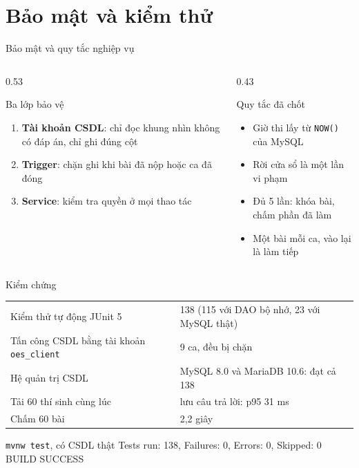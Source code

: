 \documentclass[aspectratio=169,11pt]{beamer}
\begin{document}
\section{Bảo mật và kiểm thử}
\begin{frame}{Bảo mật và quy tắc nghiệp vụ}
  \begin{columns}[T]
    \begin{column}{0.53\textwidth}
      \begin{block}{Ba lớp bảo vệ}
        \small
        \begin{enumerate}
          \item \textbf{Tài khoản CSDL}: chỉ đọc khung nhìn không có đáp án, chỉ ghi đúng cột
          \item \textbf{Trigger}: chặn ghi khi bài đã nộp hoặc ca đã đóng
          \item \textbf{Service}: kiểm tra quyền ở mọi thao tác
        \end{enumerate}
      \end{block}
    \end{column}
    \begin{column}{0.43\textwidth}
      \begin{block}{Quy tắc đã chốt}
        \small
        \begin{itemize}
          \item Giờ thi lấy từ \texttt{NOW()} của MySQL
          \item Rời cửa sổ là một lần vi phạm
          \item Đủ 5 lần: khóa bài, chấm phần đã làm
          \item Một bài mỗi ca, vào lại là làm tiếp
        \end{itemize}
      \end{block}
    \end{column}
  \end{columns}
\end{frame}

\begin{frame}{Kiểm chứng}
  \centering\small\renewcommand{\arraystretch}{1.2}
  \begin{tabular}{@{}ll@{}}
    \toprule
    Kiểm thử tự động JUnit 5 & 138 (115 với DAO bộ nhớ, 23 với MySQL thật) \\
    Tấn công CSDL bằng tài khoản \texttt{oes\_client} & 9 ca, đều bị chặn \\
    Hệ quản trị CSDL & MySQL 8.0 và MariaDB 10.6: đạt cả 138 \\
    Tải 60 thí sinh cùng lúc & lưu câu trả lời: p95 31 ms \\
    Chấm 60 bài & 2,2 giây \\
    \bottomrule
  \end{tabular}
  \vspace{1.2em}
  \begin{exampleblock}{\texttt{mvnw test}, có CSDL thật}
    \ttfamily\small Tests run: 138, Failures: 0, Errors: 0, Skipped: 0\\BUILD SUCCESS
  \end{exampleblock}
\end{frame}
\end{document}
